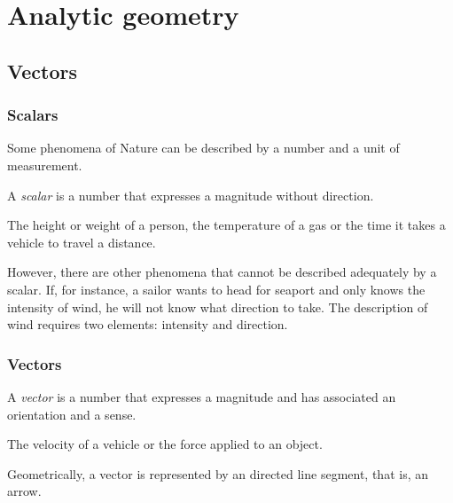 \section{Analytic geometry}


\subsection{Vectors}

\begin{frame}
\frametitle{Scalars}
Some phenomena of Nature can be described by a number and a unit of measurement. 

\begin{definition}[Scalar]
A \emph{scalar} is a number that expresses a magnitude without direction.
\end{definition}
 The height or weight of a person, the temperature of a gas or the time it takes a vehicle to travel a distance.

However, there are other phenomena that cannot be described adequately by a scalar. 
If, for instance, a sailor wants to head for seaport and only knows the intensity of wind, he will not know what direction to take. The description of wind requires two elements: intensity and direction. 
\end{frame}


\begin{frame}
\frametitle{Vectors}
\begin{definition}[Vector]
A \emph{vector} is a number that expresses a magnitude and has associated an orientation and a sense.
\end{definition}

 The velocity of a vehicle or the force applied to an object. 

Geometrically, a vector is represented by an directed line segment, that is, an arrow. 
\begin{center}

\end{center}
\end{frame}


